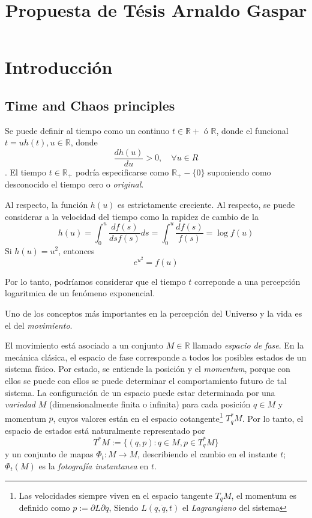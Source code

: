 \documentclass[12pt]{book}
\title{Propuesta de Tésis Arnaldo Gaspar}
\newcommand{\R}{\ensuremath{\mathbb{R}} }
\begin{document}
\maketitle
\tableofcontents

\chapter{Introducción}
\section{Time and Chaos principles}
Se puede definir al tiempo como un continuo $t \in \R+$ ó $\R$, donde el
funcional $t = uh(t), u \in
\R$, donde $$\frac{dh(u)}{du} > 0, \quad \forall u \in R$$. El tiempo $t \in
\R_+$ podría especificarse como $\R_+ - \{0\}$ suponiendo como desconocido el
tiempo cero o \textit{original}.

Al respecto, la función $h(u)$ es estrictamente creciente. Al respecto, se puede
considerar a la velocidad del tiempo como la rapidez de cambio de la 
$$
	h(u) = \int_{0}^{u} \frac{df(s)}{dsf(s)}ds = \int_{0}^{u}\frac{df(s)}{f(s)} =  \log f(u)
$$
Si $h(u) = u^2$, entonces 
$$
	e^{u^2} = f(u) 
$$

Por lo tanto, podríamos considerar que el tiempo $t$ correponde a una percepción
logaritmica de un fenómeno exponencial. 

Uno de los conceptos más importantes en la percepción del Universo y la vida es
el del \textit{movimiento}. 

El movimiento está asociado a un conjunto $M \in \R$ llamado \textit{espacio de
fase}.
En la mecánica clásica, el espacio de fase corresponde a todos los posibles
estados de un sistema físico.
Por estado, se entiende la posición y el \textit{momentum}, porque con ellos se
puede con ellos se puede determinar el comportamiento futuro de tal sistema.
La configuración de un espacio puede estar determinada por una \textit{variedad}
$M$ (dimensionalmente finita o infinita) para cada posición $q \in M$ y momentum
$p$, cuyos valores están en el espacio cotangente\footnote{Las velocidades
siempre viven en el espacio tangente $T_q M$, el momentum es definido como $p :=
\partial L  \partial q $, Siendo $L(q, \dot{q}, t)$ el \textit{Lagrangiano} del sistema}  $T_q^*M$. Por lo tanto, el
espacio de estados está naturalmente representado  por
$$
	T^* M := \{ (q, p) : q \in M, p \in T_q^* M \}
$$
y un conjunto de mapas $\Phi_t: M \rightarrow M$, describiendo el cambio en el
instante $t$; $\Phi_t(M)$ es la \textit{fotografía instantanea} en $t$.
\end{document}
